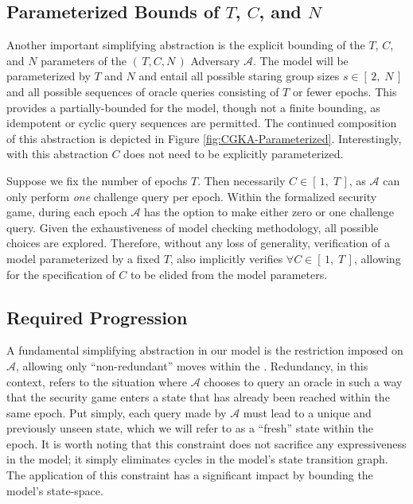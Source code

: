 \documentclass[runningheads]{llncs}
\newcommand{\Adversary}{\ensuremath{\mathcal{A}}\xspace}
\newcommand{\NumericRange}[2]{\ensuremath{\left[\,#1,\; #2\,\right]}\xspace}
\begin{document}
\subsection{Parameterized Bounds of $T$, $C$, and $N$}

Another important simplifying abstraction is the explicit bounding of the $T$, $C$, and $N$ parameters of the \((\,T, C, N\,)\) Adversary \Adversary.
The model will be parameterized by $T$ and $N$ and entail all possible staring group sizes $s \in \NumericRange{2}{N}$ and all possible sequences of oracle queries consisting of $T$ or fewer epochs.
This provides a partially-bounded for the model, though not a finite bounding, as idempotent or cyclic query sequences are permitted.
The continued composition of this abstraction is depicted in Figure \ref{fig:CGKA-Parameterized}.
Interestingly, with this abstraction $C$ does not need to be explicitly parameterized.

Suppose we fix the number of epochs $T$.
Then necessarily $C \in \NumericRange{1}{T}$, as \Adversary can only perform \emph{one} challenge query per epoch.
Within the formalized security game, during each epoch \Adversary has the option to make either zero or one challenge query.
Given the exhaustiveness of model checking methodology, all possible choices are explored.
Therefore, without any loss of generality, verification of a model parameterized by a fixed $T$, also implicitly verifies $\forall C \in \NumericRange{1}{T}$, allowing for the specification of $C$ to be elided from the model parameters.


\subsection{Required Progression\label{sec:abstraction-progression}}

A fundamental simplifying abstraction in our model is the restriction imposed on \Adversary, allowing only ``non-redundant'' moves within the \CGKAsec.
Redundancy, in this context, refers to the situation where \Adversary chooses to query an oracle in such a way that the security game enters a state that has already been reached within the same epoch.
Put simply, each query made by \Adversary must lead to a unique and previously unseen state, which we will refer to as a ``fresh'' state within the epoch.
It is worth noting that this constraint does not sacrifice any expressiveness in the model; it simply eliminates cycles in the model's state transition graph.
The application of this constraint has a significant impact by bounding the model's state-space.
\end{document}
